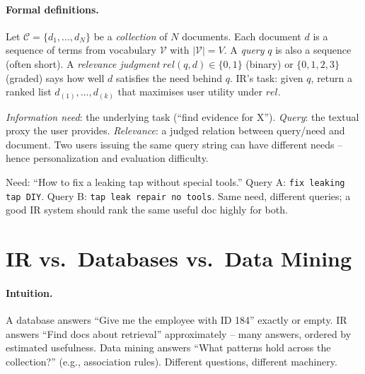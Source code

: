 \paragraph{Formal definitions.} Let $\mathcal{C}=\{d_1,\dots,d_N\}$ be a \emph{collection} of $N$ documents. Each document $d$ is a sequence of terms from vocabulary $\mathcal{V}$ with $|\mathcal{V}|=V$. A \emph{query} $q$ is also a sequence (often short). A \emph{relevance judgment} $rel(q,d)\in\{0,1\}$ (binary) or $\{0,1,2,3\}$ (graded) says how well $d$ satisfies the need behind $q$. IR's task: given $q$, return a ranked list $d_{(1)},\dots,d_{(k)}$ that maximises user utility under $rel$.

\begin{definition}
\emph{Information need}: the underlying task (``find evidence for X''). \emph{Query}: the textual proxy the user provides. \emph{Relevance}: a judged relation between query/need and document. Two users issuing the same query string can have different needs -- hence personalization and evaluation difficulty.
\end{definition}

\begin{example}
Need: ``How to fix a leaking tap without special tools.'' Query A: \texttt{fix leaking tap DIY}. Query B: \texttt{tap leak repair no tools}. Same need, different queries; a good IR system should rank the same useful doc highly for both.
\end{example}

\section{IR vs.\ Databases vs.\ Data Mining}\label{sec:ir-vs-db}
\paragraph{Intuition.} A database answers ``Give me the employee with ID 184'' exactly or empty. IR answers ``Find docs about retrieval'' approximately -- many answers, ordered by estimated usefulness. Data mining answers ``What patterns hold across the collection?'' (e.g., association rules). Different questions, different machinery.

